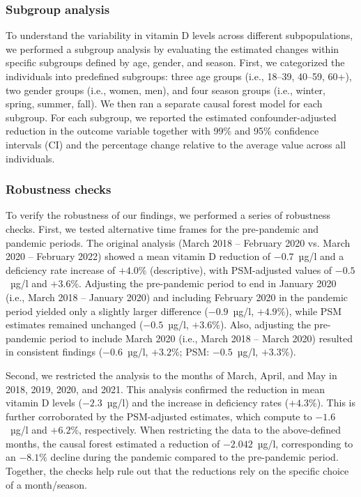 \documentclass[12pt]{article}
\begin{document}
\subsubsection*{Subgroup analysis}

To understand the variability in vitamin D levels across different subpopulations, we performed a subgroup analysis by evaluating the estimated changes within specific subgroups defined by age, gender, and season. First, we categorized the individuals into predefined subgroups: three age groups (i.e., 18--39, 40--59, 60+), two gender groups (i.e., women, men), and four season groups (i.e., winter, spring, summer, fall). We then ran a separate causal forest model for each subgroup. For each subgroup, we reported the estimated confounder-adjusted reduction in the outcome variable together with 99\% and 95\% confidence intervals (CI) and the percentage change relative to the average value across all individuals. 

\subsubsection*{Robustness checks}

To verify the robustness of our findings, we performed a series of robustness checks. First, we tested alternative time frames for the pre-pandemic and pandemic periods. The original analysis (March 2018 -- February 2020 vs. March 2020 -- February 2022) showed a mean vitamin D reduction of $-0.7$~µg/l and a deficiency rate increase of $+4.0\%$ (descriptive), with PSM-adjusted values of $-0.5$~µg/l and $+3.6\%$. Adjusting the pre-pandemic period to end in January 2020 (i.e., March 2018 -- January 2020) and including February 2020 in the pandemic period yielded only a slightly larger difference ($-0.9$~µg/l, $+4.9\%$), while PSM estimates remained unchanged ($-0.5$~µg/l, $+3.6\%$). Also, adjusting the pre-pandemic period to include March 2020 (i.e., March 2018 -- March 2020) resulted in consistent findings ($-0.6$~µg/l, $+3.2\%$; PSM: $-0.5$~µg/l, $+3.3\%$). 

Second, we restricted the analysis to the months of March, April, and May in 2018, 2019, 2020, and 2021. This analysis confirmed the reduction in mean vitamin D levels ($-2.3$~µg/l) and the increase in deficiency rates ($+4.3\%$). This is further corroborated by the PSM-adjusted estimates, which compute to $-1.6$~µg/l and $+6.2\%$, respectively. When restricting the data to the above-defined months, the causal forest estimated a reduction of $-2.042$~µg/l, corresponding to an $-8.1\%$ decline during the pandemic compared to the pre-pandemic period. Together, the checks help rule out that the reductions rely on the specific choice of a month/season. 
\end{document}
